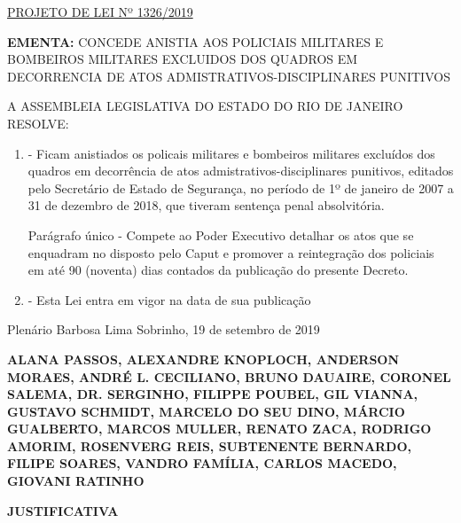 \documentclass[10pt]{article}
\date{}
\begin{document}
\maketitle
\begin{center}
  \huge
  \vspace{-3cm}\href{http://alerjln1.alerj.rj.gov.br/scpro1923.nsf/f4b46b3cdbba990083256cc900746cf6/1f8c0a4d545d66688325847a00664775?OpenDocument}{PROJETO DE LEI Nº 1326/2019}
\bigskip
\bigskip
\bigskip
  
\end{center}

\textbf{EMENTA:} 
CONCEDE ANISTIA AOS POLICIAIS MILITARES E BOMBEIROS MILITARES EXCLUIDOS DOS QUADROS EM DECORRENCIA DE ATOS ADMISTRATIVOS-DISCIPLINARES PUNITIVOS








\bigskip

\noindent
A ASSEMBLEIA LEGISLATIVA DO ESTADO DO RIO DE JANEIRO RESOLVE:

\begin{enumerate}[label=Art. \arabic*\textdegree]

\item - Ficam anistiados os policais militares e bombeiros militares excluídos dos quadros em decorrência de atos admistrativos-disciplinares punitivos, editados pelo Secretário de Estado de Segurança, no período de 1º de janeiro de 2007 a 31 de dezembro de 2018, que tiveram sentença penal absolvitória.

Parágrafo único - Compete ao Poder Executivo detalhar os atos que se enquadram no disposto pelo Caput e promover a reintegração dos policiais em até 90 (noventa) dias contados da publicação do presente Decreto.


\item - Esta Lei entra em vigor na data de sua publicação


\end{enumerate}




\begin{center}
  Plenário Barbosa Lima Sobrinho, 19 de setembro de 2019

   \bigskip

  \textbf{ ALANA PASSOS, ALEXANDRE KNOPLOCH, ANDERSON  MORAES, ANDRÉ L. CECILIANO, BRUNO DAUAIRE, CORONEL SALEMA, DR. SERGINHO, FILIPPE POUBEL, GIL VIANNA, GUSTAVO SCHMIDT, MARCELO DO SEU DINO, MÁRCIO GUALBERTO, MARCOS MULLER, RENATO ZACA, RODRIGO AMORIM, ROSENVERG REIS, SUBTENENTE BERNARDO, FILIPE SOARES, VANDRO FAMÍLIA, CARLOS MACEDO, GIOVANI RATINHO}

  \bigskip

  \textbf{JUSTIFICATIVA}
  \bigskip

\end{center}
\end{document}
